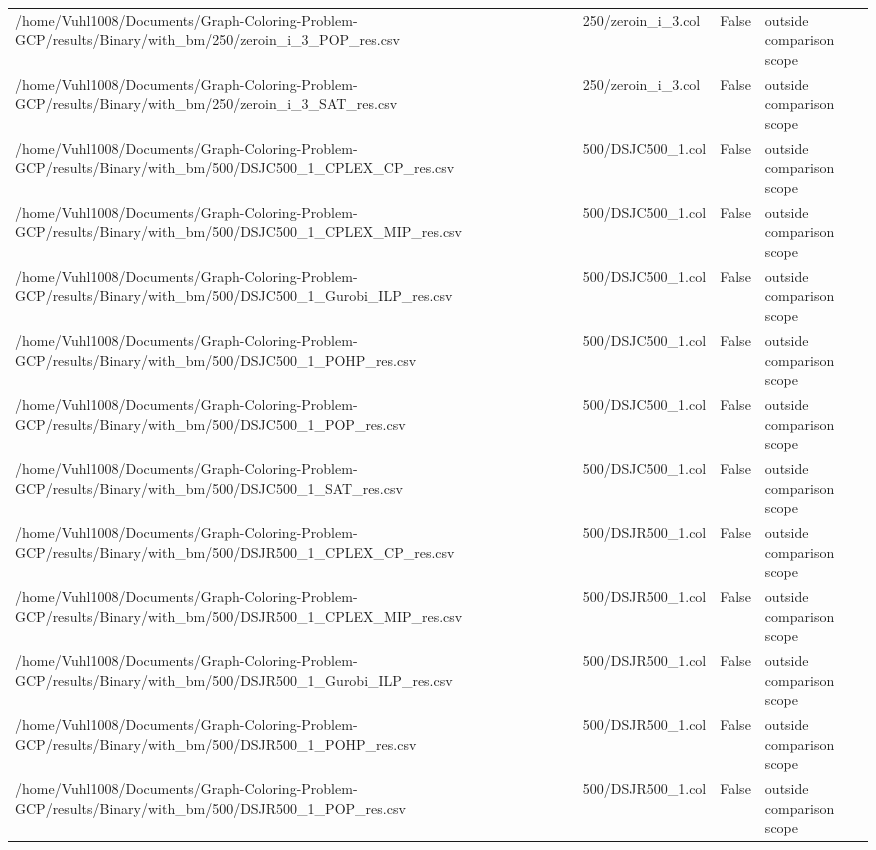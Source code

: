 \begin{table}[htbp]
\begin{tabular}{llll}
/home/Vuhl1008/Documents/Graph-Coloring-Problem-GCP/results/Binary/with\_bm/250/zeroin\_i\_3\_POP\_res.csv & 250/zeroin\_i\_3.col & False & outside comparison scope \\
/home/Vuhl1008/Documents/Graph-Coloring-Problem-GCP/results/Binary/with\_bm/250/zeroin\_i\_3\_SAT\_res.csv & 250/zeroin\_i\_3.col & False & outside comparison scope \\
/home/Vuhl1008/Documents/Graph-Coloring-Problem-GCP/results/Binary/with\_bm/500/DSJC500\_1\_CPLEX\_CP\_res.csv & 500/DSJC500\_1.col & False & outside comparison scope \\
/home/Vuhl1008/Documents/Graph-Coloring-Problem-GCP/results/Binary/with\_bm/500/DSJC500\_1\_CPLEX\_MIP\_res.csv & 500/DSJC500\_1.col & False & outside comparison scope \\
/home/Vuhl1008/Documents/Graph-Coloring-Problem-GCP/results/Binary/with\_bm/500/DSJC500\_1\_Gurobi\_ILP\_res.csv & 500/DSJC500\_1.col & False & outside comparison scope \\
/home/Vuhl1008/Documents/Graph-Coloring-Problem-GCP/results/Binary/with\_bm/500/DSJC500\_1\_POHP\_res.csv & 500/DSJC500\_1.col & False & outside comparison scope \\
/home/Vuhl1008/Documents/Graph-Coloring-Problem-GCP/results/Binary/with\_bm/500/DSJC500\_1\_POP\_res.csv & 500/DSJC500\_1.col & False & outside comparison scope \\
/home/Vuhl1008/Documents/Graph-Coloring-Problem-GCP/results/Binary/with\_bm/500/DSJC500\_1\_SAT\_res.csv & 500/DSJC500\_1.col & False & outside comparison scope \\
/home/Vuhl1008/Documents/Graph-Coloring-Problem-GCP/results/Binary/with\_bm/500/DSJR500\_1\_CPLEX\_CP\_res.csv & 500/DSJR500\_1.col & False & outside comparison scope \\
/home/Vuhl1008/Documents/Graph-Coloring-Problem-GCP/results/Binary/with\_bm/500/DSJR500\_1\_CPLEX\_MIP\_res.csv & 500/DSJR500\_1.col & False & outside comparison scope \\
/home/Vuhl1008/Documents/Graph-Coloring-Problem-GCP/results/Binary/with\_bm/500/DSJR500\_1\_Gurobi\_ILP\_res.csv & 500/DSJR500\_1.col & False & outside comparison scope \\
/home/Vuhl1008/Documents/Graph-Coloring-Problem-GCP/results/Binary/with\_bm/500/DSJR500\_1\_POHP\_res.csv & 500/DSJR500\_1.col & False & outside comparison scope \\
/home/Vuhl1008/Documents/Graph-Coloring-Problem-GCP/results/Binary/with\_bm/500/DSJR500\_1\_POP\_res.csv & 500/DSJR500\_1.col & False & outside comparison scope \\

\end{tabular}
\end{table}
